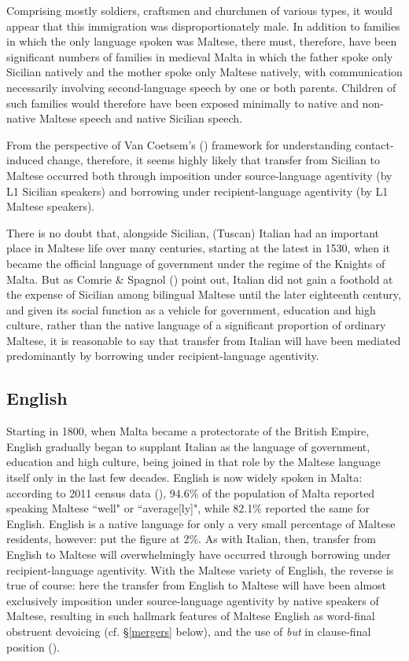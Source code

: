 \documentclass[output=paper]{langsci/langscibook}
\begin{document}
Comprising mostly soldiers, craftsmen and churchmen of various types, it would appear that this immigration was disproportionately male. In addition to families in which the only language spoken was Maltese, there must, therefore, have been significant numbers of families in medieval Malta in which the father spoke only Sicilian natively and the mother spoke only Maltese natively, with communication necessarily involving second-language speech by one or both parents. Children of such families would therefore have been exposed minimally to native and non-native Maltese speech and native Sicilian speech.

From the perspective of Van Coetsem's (\citeyear{VanCoetsem1988,VanCoetsem2000}) framework for understanding contact-induced change, therefore, it seems highly likely that transfer from Sicilian to Maltese occurred both through imposition under source-language agentivity (by L1 Sicilian speakers) and borrowing under recipient-language agentivity (by L1 Maltese speakers).

There is no doubt that, alongside Sicilian, (Tuscan) Italian had an important place in Maltese life over many centuries, starting at the latest in 1530, when it became the official language of government under the regime of the Knights of Malta. But as Comrie \& Spagnol (\citeyear[316]{comriespagnol2016}) point out, Italian did not gain a foothold at the expense of Sicilian among bilingual Maltese until the later eighteenth century, and given its social function as a vehicle for government, education and high culture, rather than the native language of a significant proportion of ordinary Maltese, it is reasonable to say that transfer from Italian will have been mediated predominantly by borrowing under recipient-language agentivity. 

\subsection{English} \label{English}
Starting in 1800, when Malta became a protectorate of the British Empire, English gradually began to supplant Italian as the language of government, education and high culture, being joined in that role by the Maltese language itself only in the last few decades. English is now widely spoken in Malta: according to 2011 census data (\citealt[149]{census2011}), 94.6\% of the population of Malta reported speaking Maltese ``well" or ``average[ly]", while 82.1\% reported the same for English. English is a native language for only a very small percentage of Maltese residents, however: \cite{scirihavassallo2006} put the figure at 2\%. As with Italian, then, transfer from English to Maltese will overwhelmingly have occurred through borrowing under recipient-language agentivity. With the Maltese variety of English, the reverse is true of course: here the transfer from English to Maltese will have been almost exclusively imposition under source-language  agentivity by native speakers of Maltese, resulting in such hallmark features of Maltese English as word-final obstruent devoicing (cf. §\ref{mergers} below), and the use of \textit{but} in clause-final position (\citealt[527]{Lucas2015}).
\end{document}
